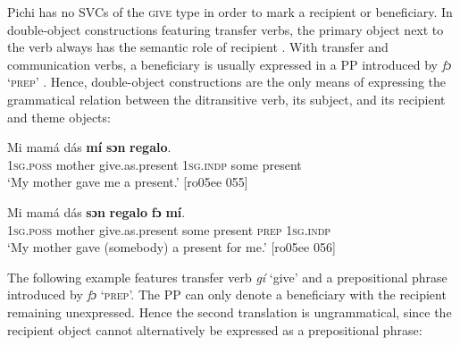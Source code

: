 Pichi has no SVCs of the \textsc{give} type in order to mark a recipient or beneficiary. In double-object constructions featuring transfer verbs, the primary object next to the verb always has the semantic role of recipient . With transfer and communication verbs, a beneficiary is usually expressed in a PP introduced by \textit{fɔ} ‘\textsc{prep’} . Hence, double-object constructions are the only means of expressing the grammatical relation between the ditransitive verb, its subject, and its recipient and theme objects: 


\ea%
    \label{ex:key:1203}
    \gll Mi    mamá  dás        \textbf{mí}    \textbf{sɔn}   \textbf{regalo}.\\
\textsc{1sg.poss}  mother  give.as.present  \textsc{1sg.indp}  some  present\\

\glt ‘My mother gave me a present.’ [ro05ee 055]
\z


\ea%
    \label{ex:key:1204}
    \gll Mi    mamá  dás        \textbf{sɔn}   \textbf{regalo}  \textbf{fɔ}  \textbf{mí}.\\
\textsc{1sg.poss}  mother  give.as.present  some  present  \textsc{prep}  \textsc{1sg.indp}\\

\glt ‘My mother gave (somebody) a present for me.’ [ro05ee 056]
\z

The following example features transfer verb \textit{gí} ‘give’ and a prepositional phrase introduced by \textit{fɔ} ‘\textsc{prep}’. The PP can only denote a beneficiary with the recipient remaining unexpressed. Hence the second translation is ungrammatical, since the recipient object cannot alternatively be expressed as a prepositional phrase:


